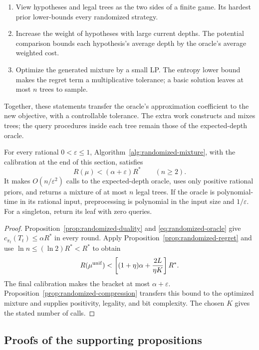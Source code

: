 \begin{proofstrategy}
\begin{enumerate}
\item View hypotheses and legal trees as the two sides of a finite
      game. Its hardest prior lower-bounds every randomized strategy.
\item Increase the weight of hypotheses with large current depths.
      The potential comparison bounds each hypothesis's average
      depth by the oracle's average weighted cost.
\item Optimize the generated mixture by a small LP. The entropy
      lower bound makes the regret term a multiplicative tolerance;
      a basic solution leaves at most $n$ trees to sample.
\end{enumerate}
\end{proofstrategy}

Together, these statements transfer the oracle's approximation
coefficient to the new objective, with a controllable tolerance.
The extra work constructs and mixes trees; the query procedures
inside each tree remain those of the expected-depth oracle.
\begin{theorem}
\label{thm:randomized-transfer}
For every rational $0<\varepsilon\le1$, Algorithm~\ref{alg:randomized-mixture},
with the calibration at the end of this section, satisfies
\[
 R(\mu)<(\alpha+\varepsilon)R^*\qquad(n\ge2).
\]
It makes $O(n/\varepsilon^2)$ calls to the expected-depth oracle,
uses only positive rational priors, and returns a mixture of at most
$n$ legal trees. If the oracle is polynomial-time in its rational
input, preprocessing is polynomial in the input size and
$1/\varepsilon$. For a singleton, return its leaf with zero queries.
\end{theorem}
\begin{proof}
Proposition~\ref{prop:randomized-duality} and \eqref{eq:randomized-oracle} give
$c_{\pi_t}(T_t)\le\alpha R^*$ in every round. Apply
Proposition~\ref{prop:randomized-regret} and use
$\ln n\le(\ln2)R^*<R^*$ to obtain
\[
 R(\mu^{\rm unif})<
 \left[(1+\eta)\alpha+\frac{2L}{\eta K}\right]R^*.
\]
The final calibration makes the bracket at most
$\alpha+\varepsilon$. Proposition~\ref{prop:randomized-compression} transfers this
bound to the optimized mixture and supplies positivity, legality,
and bit complexity. The chosen $K$ gives the stated number of calls.
\end{proof}

\subsection{Proofs of the supporting propositions}

